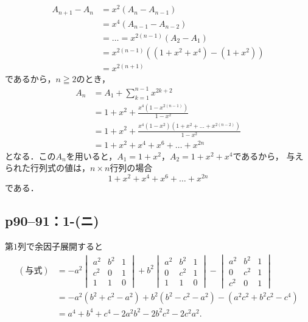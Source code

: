 \documentclass[a4paper,10pt,fleqn]{ltjsarticle}
\begin{document}
\begin{tleftbar}
    \begin{align*}
        A_{n+1}-A_{n} & = x^2 (A_n-A_{n-1})                   \\
                      & = x^4 (A_{n-1} - A_{n-2})             \\
                      & = \dots = x^{2(n-1)}(A_2-A_1)         \\
                      & = x^{2(n-1)} ((1+x^2 + x^4) -(1+x^2)) \\
                      & = x^{2(n+1)}
    \end{align*}
    であるから，$n \geqq 2$のとき，
    \begin{align*}
        A_n & = A_1 +\sum_{k=1}^{n-1} x^{2k+2}                                \\
            & = 1+x^2 + \frac{x^4(1-x^{2(n-1)})}{1-x^2}                       \\
            & = 1+x^2 + \frac{x^4 (1-x^2)(1+x^2 + \dots + x^{2(n-2)})}{1-x^2} \\
            & = 1+x^2 + x^4 + x^6 + \dots + x^{2n}
    \end{align*}
    となる．この$ A_n$を用いると，$ A_1 = 1+x^2 $，$ A_2 = 1+x^2+x^4$であるから，
    与えられた行列式の値は，$n \times n$行列の場合
    \[
        1+x^2 + x^4 + x^6 + \dots + x^{2n}
    \]
    である．
\end{tleftbar}

\newpage

\subsection*{p90--91：1-(ニ)}

\begin{tleftbar}
    第$1$列で余因子展開すると
    \begin{align*}
        (\text{与式}) & = -a^2\begin{vmatrix} a^2 & b^2 & 1 \\ c^2 & 0 & 1 \\ 1 & 1 & 0 \end{vmatrix}+b^2 \begin{vmatrix} a^2 & b^2 & 1 \\ 0 & c^2 & 1 \\ 1 & 1 & 0 \end{vmatrix} - \begin{vmatrix} a^2 & b^2 & 1 \\ 0 & c^2 & 1 \\ c^2 & 0 & 1 \end{vmatrix} \\
                    & = -a^2 (b^2+c^2 -a^2) +b^2 (b^2-c^2-a^2)- (a^2c^2+b^2c^2-c^4)                                                                                                                                                                         \\
                    & =a^4+b^4+c^4 -2a^2b^2 - 2b^2 c^2 -2c^2 a^2 .
    \end{align*}
\end{tleftbar}
\newpage
\end{document}
